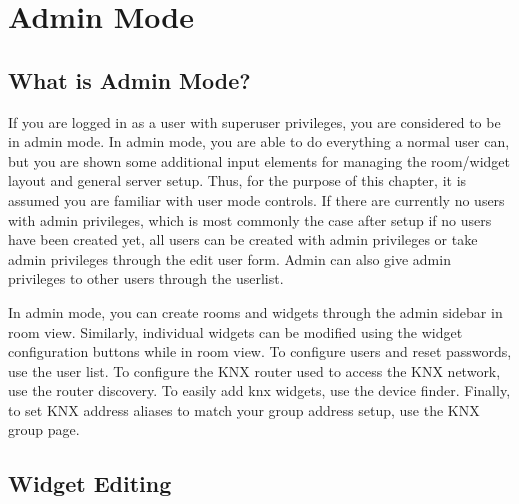 \section{Admin Mode}
\subsection{What is Admin Mode?}

  If you are logged in as a user with superuser privileges, you are considered to be in admin mode. In admin mode, you are able to do everything a normal user can, but you are shown some additional input elements for managing the room/widget layout and general server setup. Thus, for the purpose of this chapter, it is assumed you are familiar with user mode controls. If there are currently no users with admin privileges, which is most commonly the case after setup if no users have been created yet, all users can be created with admin privileges or take admin privileges through the edit user form. Admin can also give admin privileges to other users through the userlist.

  In admin mode, you can create rooms and widgets through the admin sidebar in room view. Similarly, individual widgets can be modified using the widget configuration buttons while in room view. To configure users and reset passwords, use the user list. To configure the KNX router used to access the KNX network, use the router discovery. To easily add knx widgets, use the device finder. Finally, to set KNX address aliases to match your group address setup, use the KNX group page.

  \clearpage
\subsection{Widget Editing}

